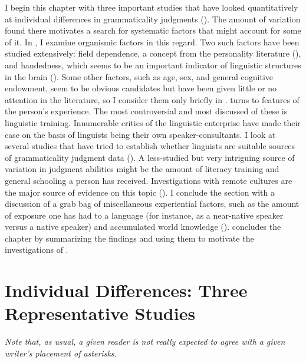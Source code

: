 I begin this chapter with three important studies that have looked quantitatively at individual differences in grammaticality judgments (). The amount of variation found there motivates a search for systematic factors that might account for some of it. In , I examine organismic factors in this regard. Two such factors have been studied extensively: field dependence, a concept from the personality literature (), and handedness, which seems to be an important indicator of linguistic structures in the brain (). Some other factors, such as age, sex, and general cognitive endowment, seem to be obvious candidates but have been given little or no attention in the literature, so I consider them only briefly in .  turns to features of the person's experience. The most controversial and most discussed of these is linguistic training. Innumerable critics of the linguistic enterprise have made their case on the basis of linguists being their own speaker-consultants. I look at several studies that have tried to establish whether linguists are suitable sources of grammaticality judgment data (). A less-studied but very intriguing source of variation in judgment abilities might be the amount of literacy training and general schooling a person has received. Investigations with remote cultures are the major source of evidence on this topic (). I conclude the section with a discussion of a grab bag of miscellaneous experiential factors, such as the amount of exposure one has had to a language (for instance, as a near-native speaker versus a native speaker) and accumulated world knowledge ().  concludes the chapter by summarizing the findings and using them to motivate the investigations of .

\section{Individual Differences: Three Representative Studies}\label{sec:4.2}

\epigraph{\itshape Note that, as usual, a given reader is not really expected to agree with a given writer's placement of asterisks.\\[-2\baselineskip]}{\citep{Neubauer1976}}

